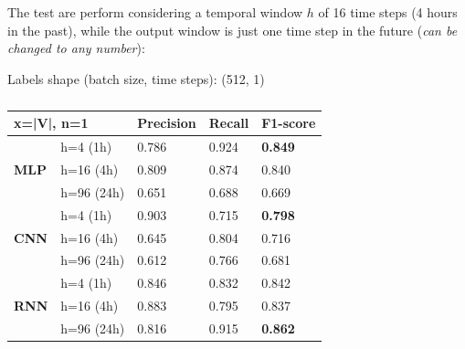 The test are perform considering a temporal window $h$ of 16 time steps (4 hours in the past), while the output window is just one time step in the future (\emph{can be changed to any number}):
\begin{algorithm}[H]
    \State Labels shape (batch size, time steps): (512, 1)
\end{algorithm}


\begin{table}[H]
\centering
\begin{tabular}{|ll|l|l|l|}
\hline
\multicolumn{2}{|l|}{x=|V|, n=1}                                    & \textbf{Precision} & \textbf{Recall} & \textbf{F1-score} \\ \hline
\multicolumn{1}{|l|}{\multirow{3}{*}{\textbf{MLP}}} & h=4 (1h)   & 0.786              & 0.924           & \textbf{0.849}    \\ \cline{2-5} 
\multicolumn{1}{|l|}{}                              & h=16 (4h)  & 0.809              & 0.874           & 0.840             \\ \cline{2-5} 
\multicolumn{1}{|l|}{}                              & h=96 (24h) & 0.651              & 0.688           & 0.669             \\ \hline
\multicolumn{1}{|l|}{\multirow{3}{*}{\textbf{CNN}}} & h=4 (1h)   & 0.903              & 0.715           & \textbf{0.798}    \\ \cline{2-5} 
\multicolumn{1}{|l|}{}                              & h=16 (4h)  & 0.645              & 0.804           & 0.716             \\ \cline{2-5} 
\multicolumn{1}{|l|}{}                              & h=96 (24h) & 0.612              & 0.766           & 0.681             \\ \hline
\multicolumn{1}{|l|}{\multirow{3}{*}{\textbf{RNN}}} & h=4 (1h)   & 0.846              & 0.832           & 0.842             \\ \cline{2-5} 
\multicolumn{1}{|l|}{}                              & h=16 (4h)  & 0.883              & 0.795           & 0.837             \\ \cline{2-5} 
\multicolumn{1}{|l|}{}                              & h=96 (24h) & 0.816              & 0.915           & \textbf{0.862}    \\ \hline
\end{tabular}
\caption{}
\label{tab:my-table}
\end{table}


